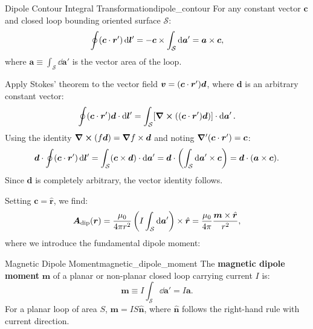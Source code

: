 \begin{proposition}{Dipole Contour Integral Transformation}{dipole_contour}
    For any constant vector $\bm{c}$ and closed loop bounding oriented surface $\mathcal{S}$:
    \begin{equation}
        \oint (\bm{c}\cdot \bm{r}')\dd{\bm{l}'} = -\bm{c}\times \int_{\mathcal{S}} \dd{\bm{a}'} = \bm{a}\times \bm{c},
    \end{equation}
    where $\bm{a} \equiv \int_{\mathcal{S}} \dd{\bm{a}'}$ is the vector area of the loop.
\end{proposition}
\begin{proofbox}
    Apply Stokes' theorem to the vector field $\bm{v} = (\bm{c}\cdot \bm{r}')\bm{d}$, where $\bm{d}$ is an arbitrary constant vector:
    \begin{equation}
        \oint (\bm{c}\cdot \bm{r}')\bm{d}\cdot \dd{\bm{l}'} = \int_{\mathcal{S}} [\curl((\bm{c}\cdot \bm{r}')\bm{d})]\cdot \dd{\bm{a}'}.
    \end{equation}
    Using the identity $\curl(f \bm{d}) = \grad f \times \bm{d}$ and noting $\grad'(\bm{c}\cdot \bm{r}') = \bm{c}$:
    \begin{equation}
        \bm{d}\cdot \oint (\bm{c}\cdot \bm{r}')\dd{\bm{l}'} = \int_{\mathcal{S}} (\bm{c}\times \bm{d})\cdot \dd{\bm{a}'} = \bm{d}\cdot \left(\int_{\mathcal{S}} \dd{\bm{a}'} \times \bm{c}\right) = \bm{d}\cdot (\bm{a}\times \bm{c}).
    \end{equation}
    Since $\bm{d}$ is completely arbitrary, the vector identity follows.
\end{proofbox}

Setting $\bm{c} = \hat{\bm{r}}$, we find:
\begin{equation}
    \bm{A}_{\text{dip}}(\bm{r}) = \frac{\mu_0}{4\pi r^2} \left(I \int_{\mathcal{S}}\dd{\bm{a}'}\right) \times \hat{\bm{r}} = \frac{\mu_0}{4\pi} \frac{\bm{m}\times \hat{\bm{r}}}{r^2},
\end{equation}
where we introduce the fundamental dipole moment:

\begin{definition}{Magnetic Dipole Moment}{magnetic_dipole_moment}
    The \textbf{magnetic dipole moment} $\bm{m}$ of a planar or non-planar closed loop carrying current $I$ is:
    \begin{equation}
        \bm{m} \equiv I \int_{\mathcal{S}} \dd{\bm{a}'} = I \bm{a}.
    \end{equation}
    For a planar loop of area $S$, $\bm{m} = I S \hat{\bm{n}}$, where $\hat{\bm{n}}$ follows the right-hand rule with current direction.
\end{definition}

